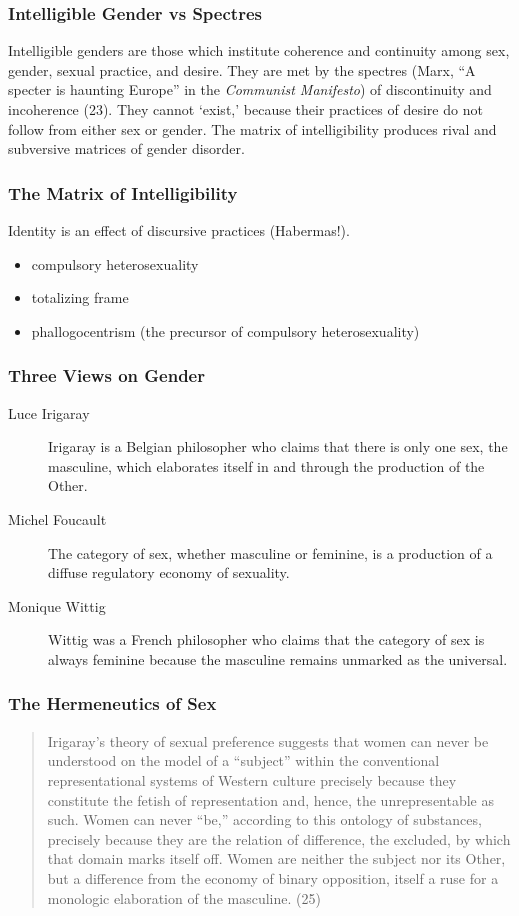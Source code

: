 \documentclass[xcolor=dvipsnames]{beamer}
\begin{document}
\begin{frame}
  \frametitle{Intelligible Gender vs Spectres}
  Intelligible genders are those which institute coherence and
  continuity among sex, gender, sexual practice, and desire. They are
  met by the spectres (Marx, ``A specter is haunting Europe'' in the
  \emph{Communist Manifesto}) of discontinuity and incoherence (23).
  They cannot `exist,' because their practices of desire do not follow
  from either sex or gender. The matrix of intelligibility produces
  rival and subversive matrices of gender disorder.
\end{frame}

\begin{frame}
  \frametitle{The Matrix of Intelligibility}
  Identity is an effect of discursive practices (Habermas!). 
  \begin{itemize}
  \item compulsory heterosexuality
  \item totalizing frame
  \item phallogocentrism (the precursor of compulsory heterosexuality)
  \end{itemize}
\end{frame}

\begin{frame}
  \frametitle{Three Views on Gender}
  \begin{description}
  \item[Luce Irigaray] Irigaray is a Belgian philosopher who claims
    that there is only one sex, the masculine, which elaborates itself
    in and through the production of the Other.
  \item[Michel Foucault] The category of sex, whether masculine or
    feminine, is a production of a diffuse regulatory economy of
    sexuality.
  \item[Monique Wittig] Wittig was a French philosopher who claims
    that the category of sex is always feminine because the masculine
    remains unmarked as the universal.
  \end{description}
\end{frame}

\begin{frame}
  \frametitle{The Hermeneutics of Sex}
  \begin{quote}
    Irigaray's theory of sexual preference suggests that women can
    never be understood on the model of a ``subject'' within the
    conventional representational systems of  Western culture
    precisely because they constitute the fetish of representation
    and, hence, the unrepresentable as such. Women can never ``be,''
    according to this ontology of substances, precisely because they
    are the relation of difference, the excluded, by which that domain
    marks itself off. Women are neither the subject nor its Other, but
    a difference from the economy of binary opposition, itself a ruse
    for a monologic elaboration of the masculine. (25)
  \end{quote}
\end{frame}
\end{document}
